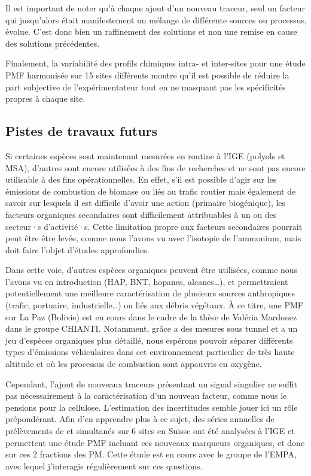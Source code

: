 Il est important de noter qu'à chaque ajout d'un nouveau traceur, seul un facteur qui
jusqu'alors était manifestement un mélange de différente sources ou processus, évolue.
C'est donc bien un raffinement des solutions et non une remise en cause des solutions
précédentes.

Finalement, la variabilité des profils chimiques intra- et inter-sites pour une étude
PMF harmonisée sur 15 sites différents montre qu'il est possible de réduire la part
subjective de l'expérimentateur tout en ne masquant pas les spécificités propres à chaque
site.

\subsection{Pistes de travaux futurs}%
\label{sub:pistes_de_travaux_futurs}

Si certaines espèces sont maintenant mesurées en routine à l'IGE (polyols et MSA),
d'autres sont encore utilisées à des fins de recherches et ne sont pas encore utilisable
à des fins opérationnelles. En effet, s'il est possible d'agir sur les émissions de
combustion de biomase ou liés au trafic routier mais également de savoir sur lesquels il
est difficile d'avoir une action (primaire biogénique), les facteurs organiques
secondaires sont difficilement attribuables à un ou des secteur·s d'activité·s. Cette
limitation propre aux facteurs secondaires pourrait peut être être levée, comme nous
l'avons vu avec l'isotopie de l'ammonium, mais doit faire l'objet d'études approfondies.

Dans cette voie, d'autres espèces organiques peuvent être utilisées, comme nous l'avons
vu en introduction (HAP, BNT, hopanes, alcanes…), et permettraient potentiellement une
meilleure caractérisation de plusieurs sources anthropiques (trafic, portuaire,
industrielle…) ou liés aux débris végétaux.  À ce titre, une PMF sur La Paz (Bolivie) est
en cours dans le cadre de la thèse de Valéria Mardonez dans le groupe CHIANTI.
Notamment, grâce a des mesures sous tunnel et a un jeu d'espèces organiques plus
détaillé, nous espérons pouvoir séparer différents types d'émissions véhiculaires dans
cet environnement particulier de très haute altitude et où les processus de combustion
sont appauvris en oxygène.

Cependant, l'ajout de nouveaux traceurs présentant un signal singulier ne suffit pas
nécessairement à la caractérisation d'un nouveau facteur, comme nous le pensions pour la
cellulose. L'estimation des incertitudes semble jouer ici un rôle prépondérant.  Afin
d'en apprendre plus à ce sujet, des séries annuelles de prélèvements de \PMdix{} et
\PMdc{} simultanés sur 6 sites en Suisse ont été analysées à l'IGE et permettent une
étude PMF incluant ces nouveaux marqueurs organiques, et donc sur ces 2 fractions des PM.
Cette étude est en cours avec le groupe de l'EMPA, avec lequel j'interagis régulièrement
sur ces questions.

